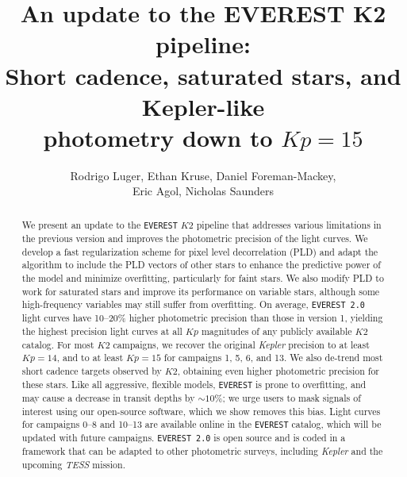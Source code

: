 \documentclass[]{emulateapj}
\newcommand{\Kp}{\ensuremath{Kp}}
\newcommand{\edited}[1]{{\color{red} #1}}
\begin{document}
\title{An update to the EVEREST K2 pipeline:\\ Short cadence, saturated stars, and Kepler-like\\ photometry down to $\Kp = 15$}
\author{Rodrigo Luger, Ethan Kruse, Daniel Foreman-Mackey,\\
Eric Agol, Nicholas Saunders}

\begin{abstract}
We present an update to the \texttt{EVEREST} $K2$ pipeline that addresses various limitations
in the previous version and improves the photometric precision of the light curves.
We develop a fast regularization scheme for pixel level decorrelation (PLD) and
adapt the algorithm to include the PLD vectors of other stars to enhance the predictive
power of the model and minimize overfitting, particularly for faint stars. We also modify PLD to work for saturated
stars and improve its performance on variable stars, \edited{although some high-frequency variables may still
suffer from overfitting}. On average, \texttt{EVEREST 2.0}
light curves have 10--20\% higher photometric precision than those in version 1,
yielding the highest precision light curves at all $\Kp$ magnitudes of any publicly available $K2$
catalog. For most $K2$ campaigns, we recover the original \emph{Kepler} precision to at least
$\Kp = 14$, and to at least $\Kp = 15$ for campaigns 1, 5, 6, \edited{and 13}. We also de-trend \edited{most} short
cadence targets observed by $K2$, obtaining even higher photometric precision for these stars.
\edited{Like all aggressive, flexible models, \texttt{EVEREST} is prone to overfitting,
and may cause a decrease in transit depths by ${\sim}10\%$; we urge users to mask
signals of interest using our open-source software, which we show removes this bias.}
Light curves for campaigns 0--8 \edited{and 10--13} are available online in the \texttt{EVEREST} catalog, which
will be updated with future campaigns.
\texttt{EVEREST 2.0} is open source and is coded in a framework that can be \edited{adapted}
to other photometric surveys, including \emph{Kepler} and the upcoming \emph{TESS} mission.\\[0.1in]
\end{abstract}
\end{document}
